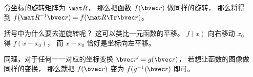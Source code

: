 
令坐标的旋转矩阵为 $\mat R$， 那么把函数 $f(\bvec r)$ 做同样的旋转， 那么将得到 $f(\mat R^{-1}\bvec r) = f(\mat R\Tr \bvec r)$。

括号中为什么要去逆旋转呢？ 这可以类比一元函数的平移。 $f(x)$ 向右移动 $x_0$ 得 $f(x-x_0)$， 而 $x-x_0$ 恰好是坐标向左平移。

同理，对于任何一一对应的坐标变换 $\bvec r' = g(\bvec r)$， 若想让函数的图像做同样的变换， 那么就把 $f(\bvec r)$ 变为 $f(g^{-1}(\bvec r)$ 即可。
